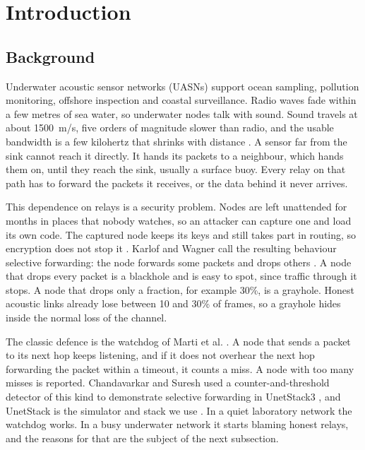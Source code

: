 \documentclass{article}
\begin{document}
\section{Introduction}\label{sec:intro}

\subsection{Background}\label{sec:background}
\noindent
Underwater acoustic sensor networks (UASNs) support ocean sampling, pollution monitoring, offshore inspection and coastal surveillance. Radio waves fade within a few metres of sea water, so underwater nodes talk with sound. Sound travels at about 1500~m/s, five orders of magnitude slower than radio, and the usable bandwidth is a few kilohertz that shrinks with distance \cite{akyildiz2005}. A sensor far from the sink cannot reach it directly. It hands its packets to a neighbour, which hands them on, until they reach the sink, usually a surface buoy. Every relay on that path has to forward the packets it receives, or the data behind it never arrives.

This dependence on relays is a security problem. Nodes are left unattended for months in places that nobody watches, so an attacker can capture one and load its own code. The captured node keeps its keys and still takes part in routing, so encryption does not stop it \cite{domingo2011,jiang2019}. Karlof and Wagner call the resulting behaviour selective forwarding: the node forwards some packets and drops others \cite{karlof2003}. A node that drops every packet is a blackhole and is easy to spot, since traffic through it stops. A node that drops only a fraction, for example 30\%, is a grayhole. Honest acoustic links already lose between 10 and 30\% of frames, so a grayhole hides inside the normal loss of the channel.

The classic defence is the watchdog of Marti et al. \cite{marti2000}. A node that sends a packet to its next hop keeps listening, and if it does not overhear the next hop forwarding the packet within a timeout, it counts a miss. A node with too many misses is reported. Chandavarkar and Suresh used a counter-and-threshold detector of this kind to demonstrate selective forwarding in UnetStack3 \cite{brc2021}, and UnetStack is the simulator and stack we use \cite{chitre2014}. In a quiet laboratory network the watchdog works. In a busy underwater network it starts blaming honest relays, and the reasons for that are the subject of the next subsection.
\end{document}
